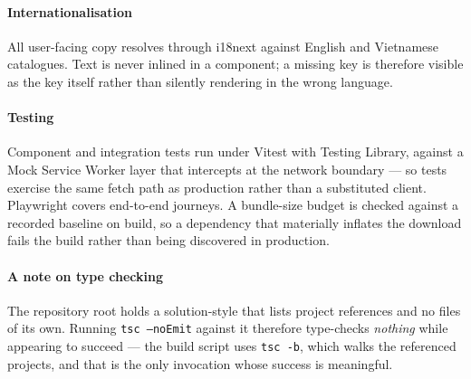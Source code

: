 \paragraph{Internationalisation}
All user-facing copy resolves through i18next against English and Vietnamese catalogues. Text is never inlined in a component; a missing key is therefore visible as the key itself rather than silently rendering in the wrong language.

\paragraph{Testing}
Component and integration tests run under Vitest with Testing Library, against a Mock Service Worker layer that intercepts at the network boundary --- so tests exercise the same fetch path as production rather than a substituted client. Playwright covers end-to-end journeys. A bundle-size budget is checked against a recorded baseline on build, so a dependency that materially inflates the download fails the build rather than being discovered in production.

\paragraph{A note on type checking}
The repository root holds a solution-style  that lists project references and no files of its own. Running \texttt{tsc --noEmit} against it therefore type-checks \emph{nothing} while appearing to succeed --- the build script uses \texttt{tsc -b}, which walks the referenced projects, and that is the only invocation whose success is meaningful.
